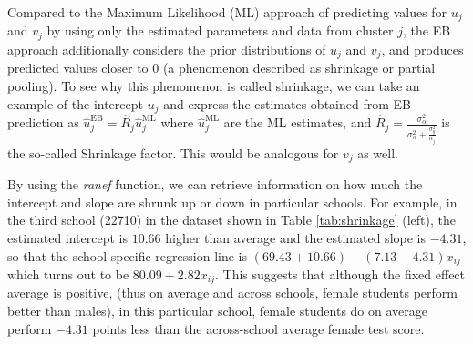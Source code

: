 Compared to the Maximum Likelihood (ML) approach of predicting values for $u_j$ and $v_j$ by using only the estimated parameters and data from cluster $j$, the EB approach additionally considers the prior distributions of $u_{j}$ and $v_{j}$, and produces predicted values closer to $0$ (a phenomenon described as shrinkage or partial pooling).  To see why this phenomenon is called shrinkage, we can take an example of the intercept $u_j$ and express the estimates obtained from EB prediction as $\hat{u}_j^{\text{EB}} = \hat{R}_j\hat{u}_j^{\text{ML}}$ where $\hat{u}_j^{\text{ML}}$ are the ML estimates, and $\hat{R}_j = \frac{\sigma_\alpha^2}{\sigma_\alpha^2 + \frac{\sigma_y^2}{n_j}}$ is the so-called Shrinkage factor. This would be analogous for $v_j$ as well.

By using the \textit{ranef} function, we can retrieve information on how much the intercept and slope are shrunk up or down in particular schools. For example, in the third school (22710) in the dataset shown in Table \ref{tab:shrinkage} (left), the estimated intercept is $10.66$ higher than average and the estimated slope is $-4.31$, so that the school-specific regression line is $(69.43 + 10.66) + (7.13 - 4.31) x_{ij}$ which turns out to be $ 80.09 + 2.82 x_{ij}$. This suggests that although the fixed effect average is positive, (thus on average and across schools, female students perform better than males), in this particular school, female students do on average perform $-4.31$ points less than the across-school average female test score.

